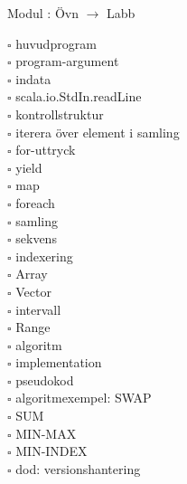 
    Modul : Övn  $\rightarrow$ Labb \Alert{\texttt{--}}
    \begin{multicols}{3}\SlideFontTiny
    $\square$ huvudprogram \\
$\square$ program-argument \\
$\square$ indata \\
$\square$ scala.io.StdIn.readLine \\
$\square$ kontrollstruktur \\
$\square$ iterera över element i samling \\
$\square$ for-uttryck \\
$\square$ yield \\
$\square$ map \\
$\square$ foreach \\
$\square$ samling \\
$\square$ sekvens \\
$\square$ indexering \\
$\square$ Array \\
$\square$ Vector \\
$\square$ intervall \\
$\square$ Range \\
$\square$ algoritm \\
$\square$ implementation \\
$\square$ pseudokod \\
$\square$ algoritmexempel: SWAP \\
$\square$ SUM \\
$\square$ MIN-MAX \\
$\square$ MIN-INDEX \\
$\square$ dod: versionshantering \\
    \end{multicols}
    